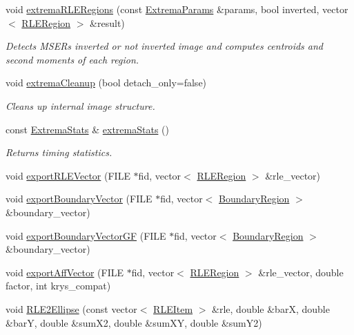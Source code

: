 \begin{CompactItemize}
void \hyperlink{namespaceextrema_f2c9422458c9780b00bb0ec050f97124}{extrema\-RLERegions} (const \hyperlink{structextrema_1_1ExtremaParams}{Extrema\-Params} \&params, bool inverted, vector$<$ \hyperlink{structextrema_1_1RLERegion}{RLERegion} $>$ \&result)
\begin{CompactList}\small\item\em Detects MSERs inverted or not inverted image and computes centroids and second moments of each region. \item\end{CompactList}\item 
void \hyperlink{namespaceextrema_5abe959d6add34bf6baa0c2024340a68}{extrema\-Cleanup} (bool detach\_\-only=false)
\begin{CompactList}\small\item\em Cleans up internal image structure. \item\end{CompactList}\item 
const \hyperlink{structextrema_1_1ExtremaStats}{Extrema\-Stats} \& \hyperlink{namespaceextrema_b329cf4824c4a326bb4ead6855531c76}{extrema\-Stats} ()
\begin{CompactList}\small\item\em Returns timing statistics. \item\end{CompactList}\item 
void \hyperlink{namespaceextrema_58eea100971137f5cec506645277cee0}{export\-RLEVector} (FILE $\ast$fid, vector$<$ \hyperlink{structextrema_1_1RLERegion}{RLERegion} $>$ \&rle\_\-vector)
\item 
void \hyperlink{namespaceextrema_db847a7fd375f76760e321deb99b5e45}{export\-Boundary\-Vector} (FILE $\ast$fid, vector$<$ \hyperlink{structextrema_1_1BoundaryRegion}{Boundary\-Region} $>$ \&boundary\_\-vector)
\item 
void \hyperlink{namespaceextrema_c167f43bca8c70f36b431ba71daff257}{export\-Boundary\-Vector\-GF} (FILE $\ast$fid, vector$<$ \hyperlink{structextrema_1_1BoundaryRegion}{Boundary\-Region} $>$ \&boundary\_\-vector)
\item 
void \hyperlink{namespaceextrema_55d2b078be8022879998650901d734a1}{export\-Aff\-Vector} (FILE $\ast$fid, vector$<$ \hyperlink{structextrema_1_1RLERegion}{RLERegion} $>$ \&rle\_\-vector, double factor, int krys\_\-compat)
\item 
void \hyperlink{namespaceextrema_905de593c22e4be0daf5d1109aaa527c}{RLE2Ellipse} (const vector$<$ \hyperlink{structextrema_1_1RLEItem}{RLEItem} $>$ \&rle, double \&bar\-X, double \&bar\-Y, double \&sum\-X2, double \&sum\-XY, double \&sum\-Y2)

\end{CompactItemize}
